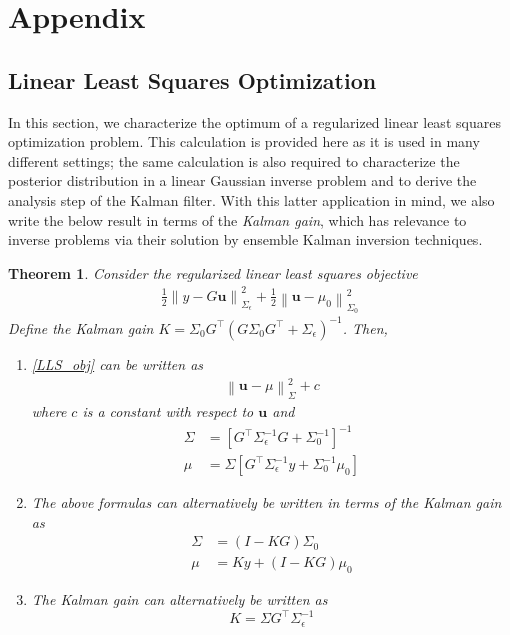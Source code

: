 \documentclass[12pt]{article}
\newcommand{\bpar}{\mathbf{u}} %
\newcommand*{\norm}[1]{\left\lVert#1\right\rVert}
\newtheorem{thm}{Theorem}
\begin{document}
\section{Appendix}

\subsection{Linear Least Squares Optimization}
In this section, we characterize the optimum of a regularized linear least squares optimization problem. This calculation is provided here as it is used in many different settings; the same calculation is also required to characterize 
the posterior distribution in a linear Gaussian inverse problem and to derive the analysis step of the Kalman filter. With this latter application in mind, we also write the below result in terms of the \textit{Kalman gain}, which has 
relevance to inverse problems via their solution by ensemble Kalman inversion techniques. 

\begin{thm}
Consider the regularized linear least squares objective 
\begin{align}
\frac{1}{2} \norm{y - G\bpar}^2_{\Sigma_\epsilon} + \frac{1}{2} \norm{\bpar - \mu_0}^2_{\Sigma_0} \label{LLS_obj}
\end{align}
Define the Kalman gain $K = \Sigma_0 G^\top (G \Sigma_0 G^\top + \Sigma_{\epsilon})^{-1}$. Then, 
\begin{enumerate}
\item \ref{LLS_obj} can be written as 
\begin{align}
\norm{\bpar - \mu}^2_\Sigma + c \label{LLN_post}
\end{align}
where $c$ is a constant with respect to $\bpar$ and 
\begin{align*}
\Sigma &= \left[G^\top \Sigma^{-1}_{\epsilon} G + \Sigma^{-1}_0\right]^{-1} \\
\mu &= \Sigma \left[G^\top \Sigma^{-1}_{\epsilon}y + \Sigma_0^{-1} \mu_0  \right]
\end{align*}

\item The above formulas can alternatively be written in terms of the Kalman gain as 
\begin{align*}
\Sigma &=  (I - KG)\Sigma_0 \\
\mu &= Ky + (I - KG) \mu_0
\end{align*}

\item The Kalman gain can alternatively be written as 
\[K = \Sigma G^\top \Sigma_{\epsilon}^{-1} \]
\end{enumerate}
\end{thm}
\end{document}
